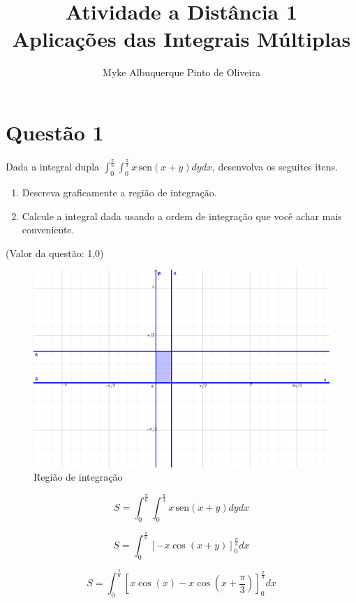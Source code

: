 \documentclass[10pt,a4paper]{article}
\author{Myke Albuquerque Pinto de Oliveira}
\title{\Huge Atividade a Distância 1 \\ 
	Aplicações das Integrais Múltiplas}
\newcommand{\sen}{\hspace{2pt}\textrm{sen}}
\begin{document}
	
	\maketitle
	\newpage
	
	\section*{Questão 1}
	
	Dada a integral dupla $ \int_{0}^{\frac{\pi}{6}} \int_{0}^{\frac{\pi}{3}} x \sen (x + y) dy dx $, desenvolva os seguites itens.
	
	\begin{enumerate}[a]
		\item Descreva graficamente a região de integração.
		\item Calcule a integral dada usando a ordem de integração que você achar mais conveniente.
	\end{enumerate}
	
	(Valor da questão: 1,0)
	
	\begin{figure}[h]
		\centering
		\includegraphics[width=0.7\linewidth]{fig/integrais-multiplas-1a}
		\caption{Região de integração}
		\label{fig:integrais-multiplas-1a}
	\end{figure}
	
	\begin{equation*}
		S = \int_{0}^{\frac{\pi}{6}} \int_{0}^{\frac{\pi}{3}} x \sen (x + y) dy dx
	\end{equation*}
	
	\begin{equation*}
		S = \int_{0}^{\frac{\pi}{6}} \left[ - x \cos (x + y) \right]_{0}^{\frac{\pi}{3}} dx
	\end{equation*}
	
	\begin{equation*}
		S = \int_{0}^{\frac{\pi}{6}} \left[ x \cos (x) - x \cos \left(x + \frac{\pi}{3} \right) \right]_{0}^{\frac{\pi}{3}} dx
	\end{equation*}
	
\end{document}
